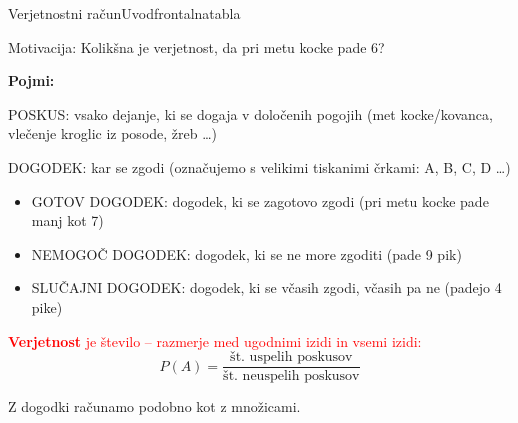 \begin{priprava}{}{}{Verjetnostni račun}{Uvod}{frontalna}{tabla}

Motivacija: Kolikšna je verjetnost, da pri metu kocke pade 6?

\textbf{Pojmi:} 

POSKUS: vsako dejanje, ki se dogaja v določenih pogojih (met kocke/kovanca, vlečenje kroglic iz posode, žreb \ldots)

DOGODEK: kar se zgodi (označujemo s velikimi tiskanimi črkami: A, B, C, D \ldots)
\begin{itemize}
    \item GOTOV DOGODEK: dogodek, ki se zagotovo zgodi (pri metu kocke pade manj kot 7)
    \item NEMOGOČ DOGODEK: dogodek, ki se ne more zgoditi (pade 9 pik)
    \item SLUČAJNI DOGODEK: dogodek, ki se včasih zgodi, včasih pa ne (padejo 4 pike)
\end{itemize}

\textcolor{red}{\textbf{Verjetnost} je število -- razmerje med ugodnimi izidi in vsemi izidi:}
$$ P(A) = \frac{\text{št. uspelih poskusov}}{\text{št. neuspelih poskusov}} $$




Z dogodki računamo podobno kot z množicami. 


\end{priprava}
